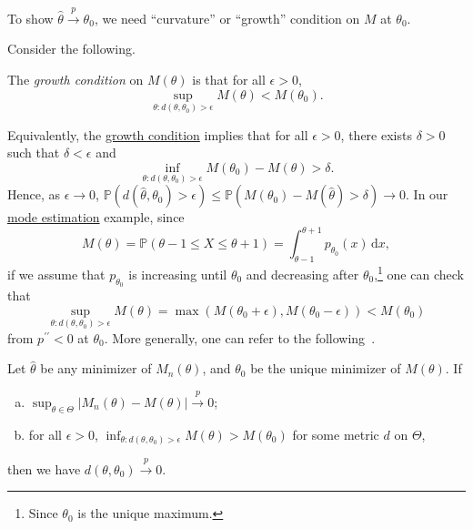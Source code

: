 To show \(\hat{\theta} \overset{p}{\to} \theta _0\), we need ``curvature'' or ``growth'' condition on \(M\) at \(\theta _0\).

\begin{center}
\end{center}

Consider the following.

\begin{definition}\label{def:growth-condition}
	The \emph{growth condition} on \(M(\theta )\) is that for all \(\epsilon > 0\),
	\[
		\sup _{\theta \colon d(\theta, \theta _0) > \epsilon } M(\theta ) < M(\theta _0).
	\]
\end{definition}

Equivalently, the \hyperref[def:growth-condition]{growth condition} implies that for all \(\epsilon > 0\), there exists \(\delta > 0\) such that \(\delta < \epsilon \) and
\[
	\inf _{\theta \colon d(\theta, \theta _0 ) > \epsilon } M(\theta _0) - M(\theta ) > \delta .
\]
Hence, as \(\epsilon \to 0\), \(\mathbb{P} (d(\hat{\theta} , \theta _0 ) > \epsilon ) \leq \mathbb{P} (M(\theta _0) - M(\hat{\theta} ) > \delta ) \to 0\). In our \hyperref[eg:mode-estimation]{mode estimation} example, since
\[
	M(\theta )
	= \mathbb{P} (\theta -1 \leq X \leq \theta +1)
	= \int_{\theta -1}^{\theta + 1} p_{\theta _0}(x) \,\mathrm{d}x,
\]
if we assume that \(p_{\theta _0}\) is increasing until \(\theta _0\) and decreasing after \(\theta _0\),\footnote{Since \(\theta _0\) is the unique maximum.} one can check that
\[
	\sup _{\theta \colon d(\theta, \theta _0) > \epsilon } M(\theta )
	= \max (M(\theta _0 + \epsilon ), M(\theta _0 - \epsilon ))
	< M(\theta _0)
\]
from \(p^{\prime\prime} < 0\) at \(\theta _0\). More generally, one can refer to the following~\cite[Theorem 5.7]{vaartAsymptoticStatistics1998}.

\begin{theorem}\label{thm:lec20}
	Let \(\hat{\theta} \) be any minimizer of \(M_n(\theta )\), and \(\theta _0\) be the unique minimizer of \(M(\theta )\). If
	\begin{enumerate}[(a)]
		\item\label{thm:lec20-a} \(\sup _{\theta \in \Theta } \vert M_n(\theta ) - M(\theta ) \vert \overset{p}{\to } 0\);
		\item for all \(\epsilon >0\), \(\inf _{\theta \colon d(\theta , \theta _0) > \epsilon } M(\theta ) > M(\theta _0)\) for some metric \(d\) on \(\Theta \),
	\end{enumerate}
	then we have \(d(\theta , \theta _0) \overset{p}{\to } 0\).
\end{theorem}

